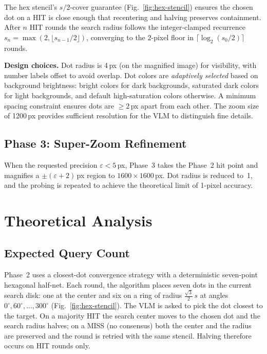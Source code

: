 \documentclass[sigconf,nonacm]{acmart}
\begin{document}
The hex stencil's $s/2$-cover guarantee (Fig.~\ref{fig:hex-stencil})
ensures the chosen dot on a HIT is close enough that recentering and
halving preserves containment.  After $n$ HIT rounds the search radius
follows the integer-clamped recurrence $s_n = \max(2, \lfloor
s_{n-1}/2\rfloor)$, converging to the $2$-pixel floor in $\lceil
\log_2(s_0/2)\rceil$ rounds.

\textbf{Design choices.}
Dot radius is 4\,px (on the magnified image) for visibility, with
number labels offset to avoid overlap.
Dot colors are \emph{adaptively selected} based on background
brightness: bright colors for dark backgrounds, saturated dark colors
for light backgrounds, and default high-saturation colors otherwise.
A minimum spacing constraint ensures dots are $\geq 2$\,px apart from
each other.
The zoom size of 1200\,px provides sufficient resolution for the VLM
to distinguish fine details.


\subsection{Phase 3: Super-Zoom Refinement}
\label{sec:phase3}

When the requested precision $\varepsilon < 5$\,px, Phase~3 takes the
Phase~2 hit point and magnifies a $\pm(\varepsilon+2)$\,px region to
$1600 \times 1600$\,px.  Dot radius is reduced to~1, and the probing
is repeated to achieve the theoretical limit of 1-pixel accuracy.


\section{Theoretical Analysis}

\subsection{Expected Query Count}
\label{sec:query-count}

Phase~2 uses a closest-dot convergence strategy with a deterministic
seven-point hexagonal half-net.  Each round, the algorithm places seven
dots in the current search disk: one at the center and six on a ring
of radius $\frac{\sqrt{3}}{2}\,s$ at angles
$0^\circ, 60^\circ, \ldots, 300^\circ$
(Fig.~\ref{fig:hex-stencil}).  The VLM is asked to pick the dot closest
to the target.  On a majority HIT the search center moves to the chosen
dot and the search radius halves; on a MISS (no consensus) both the
center and the radius are preserved and the round is retried with the
same stencil.  Halving therefore occurs on HIT rounds only.
\end{document}
